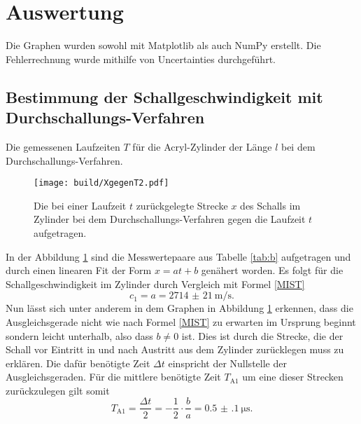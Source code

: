 \section{Auswertung}
\label{sec:Auswertung}


Die Graphen wurden sowohl mit Matplotlib \cite{matplotlib} als auch NumPy \cite{numpy} erstellt. Die
Fehlerrechnung wurde mithilfe von Uncertainties \cite{uncertainties} durchgeführt.

\subsection{Bestimmung der Schallgeschwindigkeit mit Durchschallungs-Verfahren}
\begin{table}
	\centering
	\caption{Die gemessenen Laufzeiten $T$ für die Acryl-Zylinder der Länge $l$ bei dem Durchschallungs-Verfahren.}
	
\end{table}
\begin{figure}
	\centering
	\caption{Die bei einer Laufzeit $t$ zurückgelegte Strecke $x$ des Schalls im Zylinder bei dem Durchschallungs-Verfahren gegen die Laufzeit $t$ aufgetragen.}
	\texttt{[image: build/XgegenT2.pdf]}
	\label{fig:XgegenT2}
\end{figure}
In der Abbildung \ref{fig:XgegenT2} sind die Messwertepaare aus Tabelle \ref{tab:b} aufgetragen und durch einen linearen Fit der Form $x=a t + b$ genähert worden.
Es folgt für die Schallgeschwindigkeit im Zylinder durch Vergleich mit Formel \eqref{MIST}
\begin{equation}
	c_1=a=\SI{2714(21)}{\meter\per\second}\text{.}
\end{equation}
Nun lässt sich unter anderem in dem Graphen in Abbildung \ref{fig:XgegenT2} erkennen, dass die Ausgleichsgerade nicht wie nach Formel \eqref{MIST} zu erwarten im Ursprung beginnt sondern leicht unterhalb, also dass $b \neq 0$ ist. Dies ist durch die Strecke, die der Schall vor Eintritt in und nach Austritt aus dem Zylinder zurücklegen muss zu erklären. Die dafür benötigte Zeit $\Delta t$ einspricht der Nullstelle der Ausgleichsgeraden. Für die mittlere benötigte Zeit $T_{\text{A}1}$ um eine dieser Strecken zurückzulegen gilt somit
\begin{equation}
	T_{\text{A}1}=\frac{\Delta t}{2}=-\frac{1}{2} \cdot \frac{b}{a}=\SI{0.5(1)}{\micro\second}\text{.}
\end{equation}



